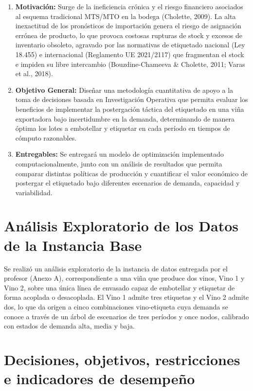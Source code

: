 \begin{enumerate} [label = \arabic*.]
    \item \textbf{Motivación:} Surge de la ineficiencia crónica y el riesgo financiero asociados al esquema tradicional MTS/MTO en la bodega (Cholette, 2009). La alta inexactitud de los pronósticos de importación genera el riesgo de asignación errónea de producto, lo que provoca costosas rupturas de stock y excesos de inventario obsoleto, agravado por las normativas de etiquetado nacional (Ley 18.455) e internacional (Reglamento UE 2021/2117) que fragmentan el stock e impiden su libre intercambio (Bouzdine-Chameeva \& Cholette, 2011; Varas et al., 2018).

    \item \textbf{Objetivo General:} Diseñar una metodología cuantitativa de apoyo a la toma de decisiones basada en Investigación Operativa que permita evaluar los beneficios de implementar la postergación táctica del etiquetado en una viña exportadora bajo incertidumbre en la demanda, determinando de manera óptima los lotes a embotellar y etiquetar en cada período en tiempos de cómputo razonables.
    
    \item \textbf{Entregables:} Se entregará un modelo de optimización implementado computacionalmente, junto con un análisis de resultados que permita comparar distintas políticas de producción y cuantificar el valor económico de postergar el etiquetado bajo diferentes escenarios de demanda, capacidad y variabilidad.

    \end{enumerate}

\section{Análisis Exploratorio de los Datos de la Instancia Base\label{sec:s0}}

Se realizó un análisis exploratorio de la instancia de datos entregada por el profesor (Anexo A), correspondiente a una viña que produce dos vinos, Vino 1 y Vino 2, sobre una única línea de envasado capaz de embotellar y etiquetar de forma acoplada o desacoplada. El Vino 1 admite tres etiquetas y el Vino 2 admite dos, lo que da origen a cinco combinaciones vino-etiqueta cuya demanda se conoce a través de un árbol de escenarios de tres períodos y once nodos, calibrado con estados de demanda alta, media y baja.


\section{Decisiones, objetivos, restricciones e indicadores de desempeño}


